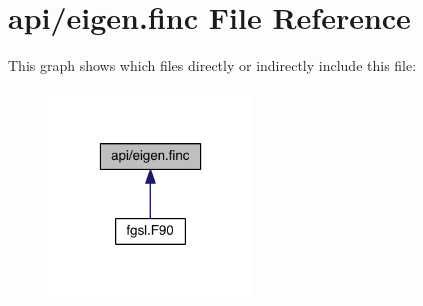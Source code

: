\hypertarget{eigen_8finc}{\section{api/eigen.finc File Reference}
\label{eigen_8finc}
}
This graph shows which files directly or indirectly include this file\-:\nopagebreak
\begin{figure}[H]
\begin{center}
\leavevmode
\includegraphics[width=154pt]{eigen_8finc__dep__incl}
\end{center}
\end{figure}
